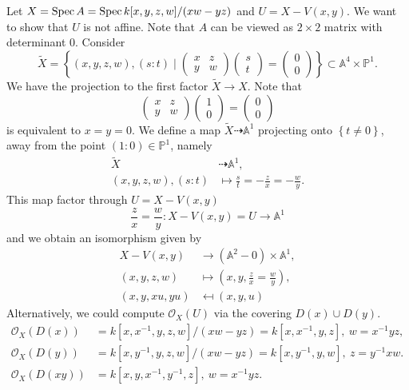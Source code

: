 \documentclass[12pt]{article}
\begin{document}
Let \(X=\mathrm{Spec}\, A=\mathrm{Spec}\, k[x,y,z,w]/(xw-yz)\) and \(U=X-V(x,y)\). We want to show that \(U\) is not affine. Note that \(A\) can be viewed as \(2\times 2\) matrix with determinant 0. Consider 
\[\tilde{X}=\left\{ (x,y,z,w),(s:t)\mid \begin{pmatrix} 
  x&z\\
  y&w
\end{pmatrix}\begin{pmatrix}
  s\\
  t
\end{pmatrix}=\begin{pmatrix}
  0\\
  0
\end{pmatrix}
\right\}\subset \mathbb{A}^4\times \mathbb{P}^1.\]
We have the projection to the first factor \(\tilde{X}\rightarrow X\). Note that 
\[\begin{pmatrix}
  x&z\\
  y&w
\end{pmatrix}\begin{pmatrix}
  1\\
  0
\end{pmatrix}=\begin{pmatrix}
  0\\
  0
\end{pmatrix}\]
is equivalent to \(x=y=0\). We define a map \(\tilde{X}\dashrightarrow  \mathbb{A}^1\) projecting onto \(\left\{ t\neq 0 \right\}\), away from the point \((1:0)\in \mathbb{P}^1\), namely 
\begin{align*}
     \tilde{X}&\dashrightarrow \mathbb{A}^1,\\
     (x,y,z,w),(s:t)&\mapsto \frac{s}{t}=-\frac{z}{x}=-\frac{w}{y}.
\end{align*}
This map factor through \(U=X-V(x,y)\)
\[\frac{z}{x}=\frac{w}{y}:X-V(x,y)=U\rightarrow \mathbb{A}^1\]
and we obtain an isomorphism given by 
\begin{align*}
     X-V(x,y)&\rightarrow (\mathbb{A}^2-0)\times \mathbb{A}^1,\\
     (x,y,z,w)&\mapsto (x,y,\frac{z}{x}=\frac{w}{y}),\\
     (x,y,xu,yu)&\mapsfrom (x,y,u)
\end{align*}
Alternatively, we could compute \(\mathcal{O}_X(U)\) via the covering \(D(x)\cup D(y)\). 
\begin{align*}
     \mathcal{O}_X(D(x))&=k[x,x^{-1},y,z,w]/(xw-yz)=k[x,x^{-1},y,z],\ w=x^{-1}yz,\\
     \mathcal{O}_X(D(y))&=k[x,y^{-1},y,z,w]/(xw-yz)=k[x,y^{-1},y,w],\ z=y^{-1}xw.\\
     \mathcal{O}_X(D(xy))&=k[x,y,x^{-1},y^{-1},z],\  w=x^{-1}yz.
\end{align*}
\end{document}
